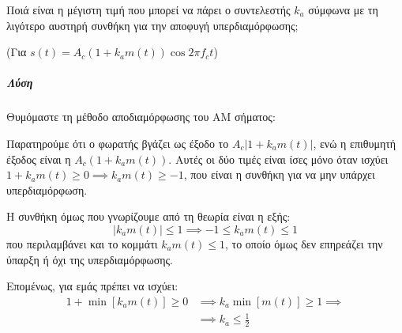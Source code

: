 \documentclass[11pt,a4paper,notitlepage,fleqn]{article}
\begin{document}
Ποιά είναι η μέγιστη τιμή που μπορεί να πάρει ο συντελεστής \( k_a \) σύμφωνα με τη
λιγότερο αυστηρή συνθήκη για την αποφυγή υπερδιαμόρφωσης;

(Για \( s(t) = A_c(1+k_am(t)) \cos2πf_ct \))

\subparagraph{Λύση}

Θυμόμαστε τη μέθοδο αποδιαμόρφωσης του AM σήματος:

Παρατηρούμε ότι ο φωρατής βγάζει ως έξοδο το \( A_c\left|1+k_a m(t)\right| \),
ενώ η επιθυμητή έξοδος είναι η \( A_c\left(1+k_a m(t)\right) \). Αυτές οι δύο τιμές είναι
ίσες μόνο όταν ισχύει \( 1+k_a m(t) \geq 0 
\implies \boxed{k_am(t)} \geq -1 \), που είναι η συνθήκη για να μην υπάρχει
υπερδιαμόρφωση.

Η συνθήκη όμως που γνωρίζουμε από τη θεωρία είναι η εξής:
\[
\left| k_am(t) \right| \leq 1 \implies -1 \leq k_a m(t) \leq 1
\]
που περιλαμβάνει και το κομμάτι \( k_am(t) \leq 1 \), το οποίο όμως δεν επηρεάζει την
ύπαρξη ή όχι της υπερδιαμόρφωσης.

Επομένως, για εμάς πρέπει να ισχύει:
\begin{align*}
	1+\min\left[ k_am(t) \right] \geq 0 &\implies
	k_a\min\left[ m(t) \right] \geq 1 \implies \\ &\implies \boxed{
		k_a \leq \frac{1}{2}
		}
\end{align*}
\end{document}
